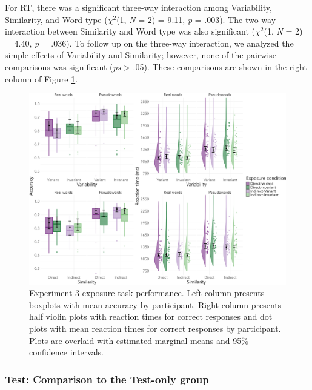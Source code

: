 \documentclass[preprint, 3p, authoryear]{elsarticle} %
\begin{document}
For RT, there was a significant three-way interaction among Variability, Similarity, and Word type (\(\chi^2\)(1, \emph{N} = 2) = 9.11, \emph{p} = .003).
The two-way interaction between Similarity and Word type was also significant (\(\chi^2\)(1, \emph{N} = 2) = 4.40, \emph{p} = .036).
To follow up on the three-way interaction, we analyzed the simple effects of Variability and Similarity; however, none of the pairwise comparisons was significant (\emph{ps} \textgreater{} .05).
These comparisons are shown in the right column of Figure \ref{fig:exp3-exp-fig}.

\begin{figure}

{\centering \includegraphics[width=\textwidth]{sections/code/outputs/plot_exp_2} 

}

\caption{Experiment 3 exposure task performance. Left column presents boxplots with mean accuracy by participant. Right column presents half violin plots with reaction times for correct responses and dot plots with mean reaction times for correct responses by participant. Plots are overlaid with estimated marginal means and 95\% confidence intervals.}\label{fig:exp3-exp-fig}
\end{figure}

\hypertarget{test-comparison-to-the-test-only-group-2}{%
\subsubsection{Test: Comparison to the Test-only group}\label{test-comparison-to-the-test-only-group-2}}
\end{document}
